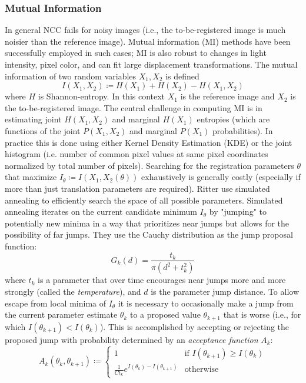 \subsubsection{Mutual Information}

In general NCC fails for noisy images (i.e., the to-be-registered image is much noisier than the reference image).
%
Mutual information (MI) methods have been successfully employed in such cases; MI is also robust to changes in light intensity, pixel color, and can fit large displacement transformations.
%
The mutual information of two random variables \(X_1, X_2\) is defined
\[
	I (X_1,X_2) \coloneqq H (X_1)+H (X_2)-H (X_1,X_2)
\]
where \(H\) is Shannon-entropy.
%
In this context \(X_1\) is the reference image and \(X_2\) is the to-be-registered image.
%
The central challenge in computing MI is in estimating joint \(H(X_1,X_2)\) and marginal \(H(X_1)\) entropies (which are functions of the joint \(P(X_1,X_2)\) and marginal \(P(X_1)\) probabilities).
%
In practice this is done using either Kernel Density Estimation (KDE) or the joint histogram (i.e. number of common pixel values at same pixel coordinates normalized by total number of pixels).
%
Searching for the registration parameters \(\theta\) that maximize \(I_{\theta} \coloneqq I(X_1,X_2(\theta))\) exhaustively is generally costly (especially if more than just translation parameters are required).
%
Ritter \etal\cite{ritter1999} use simulated annealing to efficiently search the space of all possible parameters.
%
Simulated annealing iterates on the current candidate minimum \(I_{\theta}\) by "jumping" to potentially new minima in a way that prioritizes near jumps but allows for the possibility of far jumps.
%
They use the Cauchy distribution as the jump proposal function:
\[
	G_k(d) = \frac{t_k}{\pi \left( d^2 + t_k^2 \right)}
\]
where \(t_k\) is a parameter that over time encourages near jumps more and more strongly (called the \textit{temperature}), and \(d\) is the parameter jump distance.
%
To allow escape from local minima of \(I_{\theta}\) it is necessary to occasionally make a jump from the current parameter estimate \(\theta_k\) to a proposed value \(\theta_{k+1}\) that is worse (i.e., for which \(I(\theta_{k+1}) < I(\theta_{k}) \)).
%
This is accomplished by accepting or rejecting the proposed jump with probability determined by an \textit{acceptance function} \(A_k\):
\[
	A_k(\theta_{k}, \theta_{k+1}) \coloneqq \begin{cases}
		1                                                  & \text{if } I(\theta_{k+1}) \geq I(\theta_{k}) \\
		\frac{1}{C t_k}e^{I(\theta_{k}) - I(\theta_{k+1})} & \text{otherwise}
	\end{cases}
\]

